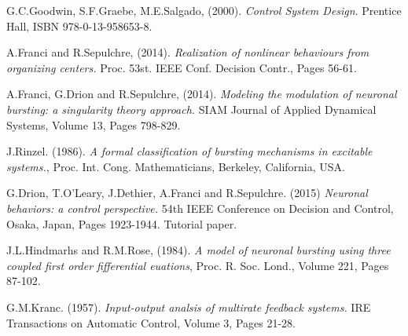 \documentclass[a4paper, 12pt]{article}
\begin{document}
\begin{thebibliography}{9}
G.C.Goodwin, S.F.Graebe, M.E.Salgado, (2000). \emph{Control System Design}. Prentice Hall, ISBN 978-0-13-958653-8.

A.Franci and R.Sepulchre, (2014). \emph{Realization of nonlinear behaviours from organizing centers.} Proc. 53st. IEEE Conf. Decision Contr., Pages 56-61.

A.Franci, G.Drion and R.Sepulchre, (2014). \emph{Modeling the modulation of neuronal bursting: a singularity theory approach.} SIAM Journal of Applied Dynamical Systems, Volume 13, Pages 798-829. 

J.Rinzel. (1986). \emph{A formal classification of bursting mechanisms in excitable systems.}, Proc. Int. Cong. Mathematicians, Berkeley, California, USA. 

G.Drion, T.O'Leary, J.Dethier, A.Franci and R.Sepulchre. (2015) \emph{Neuronal behaviors: a control perspective.} 54th IEEE Conference on Decision and Control, Osaka, Japan, Pages 1923-1944. Tutorial paper.

J.L.Hindmarhs and R.M.Rose, (1984). \emph{A model of neuronal bursting using three coupled first order fifferential euations}, Proc. R. Soc. Lond., Volume 221, Pages 87-102. 

G.M.Kranc. (1957). \emph{Input-output analsis of multirate feedback systems.} IRE Transactions on Automatic Control, Volume 3, Pages 21-28. 

\end{thebibliography}
\end{document}
